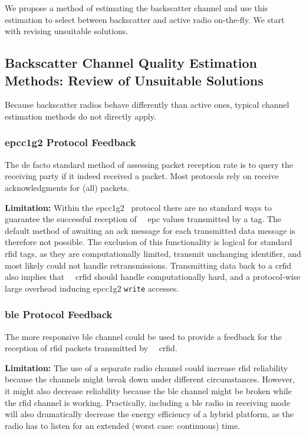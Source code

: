 \documentclass[conference,letterpaper,twoside,final,10pt]{IEEEtran}
\begin{document}
We propose a method of estimating the backscatter channel and use this estimation to select between backscatter and active radio on-the-fly. We start with revising unsuitable solutions.

\subsection{Backscatter Channel Quality Estimation Methods: Review of Unsuitable Solutions}

Because backscatter radios behave differently than active ones, typical channel estimation methods do not directly apply.

\subsubsection{\acs{epcc1g2} Protocol Feedback}
\label{sec:feedback/epc}

The de facto standard method of assessing packet reception rate is to query the receiving party if it indeed received a packet.
Most protocols rely on receive acknowledgments for (all) packets.

\textbf{Limitation:}
Within the \ac{epcc1g2}~\cite{epcglobal2013gen2} protocol there are no standard ways to guarantee the successful reception of {~~}\ac{epc} values transmitted by a tag.
The default method of awaiting an \ac{ack} message for each transmitted data message is therefore not possible.
The exclusion of this functionality is logical for standard \ac{rfid} tags, as they are computationally limited, transmit unchanging identifier, and most likely could not handle retransmissions.
Transmitting data back to a \ac{crfid} also implies that {~~}\ac{crfid} should handle computationally hard, and a protocol-wise large overhead inducing \ac{epcc1g2} \texttt{write} accesses.

\subsubsection{\acs{ble} Protocol Feedback}
\label{sec:feedback/ble}

The more responsive \ac{ble} channel could be used to provide a feedback for the reception of \ac{rfid} packets transmitted by {~~}\ac{crfid}.

\textbf{Limitation:}
The use of a separate radio channel could increase \ac{rfid} reliability because the channels might break down under different circumstances. However, it might also decrease reliability because the \ac{ble} channel might be broken while the \ac{rfid} channel is working.
Practically, including a \ac{ble} radio in receiving mode will also dramatically decrease the energy efficiency of a hybrid platform, as the radio has to listen for an extended (worst case: continuous) time.
\end{document}
